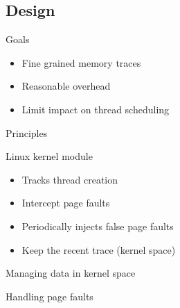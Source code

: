 \documentclass[xcolor={usenames,dvipsnames},hyperref={pdfusetitle}]{beamer}
\begin{document}
\subsection{Design}

\begin{frame}{Goals}
    \begin{block}{}
        \begin{itemize}
            \item Fine grained memory traces
            \item Reasonable overhead
            \item Limit impact on thread scheduling
        \end{itemize}
    \end{block}
\end{frame}

\begin{frame}{Principles}
    \begin{alertblock}{Linux kernel module}
        \begin{itemize}
            \item Tracks thread creation
            \item Intercept page faults
            \item Periodically injects false page faults
            \item Keep the recent trace (kernel space)
        \end{itemize}
    \end{alertblock}
\end{frame}

\begin{frame}{Managing data in kernel space}
    \centering
    \resizebox{!}{.85\textheight}{
        
    }
\end{frame}

\begin{frame}{Handling page faults}
    \centering
    \resizebox{!}{.7\textheight}{
        
    }
\end{frame}
\end{document}
